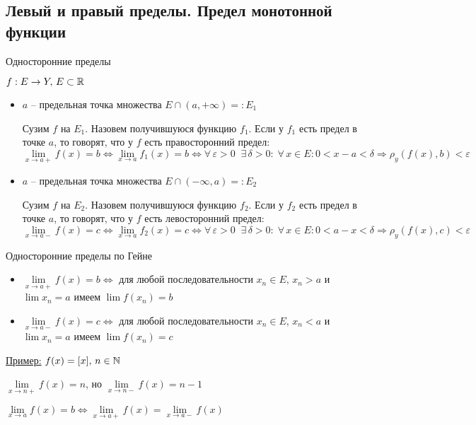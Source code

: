 \subsection{Левый и правый пределы. Предел монотонной функции \href{https://youtu.be/BiTNBigkkyU?t=6035}{\Walley}}
\begin{conj}
    Односторонние пределы
\end{conj}
$f : E \to Y, \, E \subset \mathbb{R}$
\begin{itemize}
    \item $a$ -- предельная точка множества $E \cap (a, +\infty) =: E_1$
    
    Сузим $f$ на $E_1$. Назовем получившуюся функцию $f_1$. 
    Если у $f_1$ есть предел в точке $a$, то говорят, что у $f$ есть правосторонний предел:
    \[ \lim_{x \to a+} f(x) = b \Longleftrightarrow \lim_{x \to a} f_1(x) = b \Longleftrightarrow 
    \forall \, \varepsilon > 0 \;\; \exists \, \delta > 0 : \; \forall \, x \in E : 0 < x - a < \delta \Rightarrow\rho_y(f(x), b) < \varepsilon \]
    
    \item $a$ -- предельная точка множества $E \cap (-\infty, a) =: E_2$
    
    Сузим $f$ на $E_2$. Назовем получившуюся функцию $f_2$.
    Если у $f_2$ есть предел в точке $a$, то говорят, что у $f$ есть левосторонний предел:
    \[ \lim_{x \to a-} f(x) = c \Longleftrightarrow \lim_{x \to a} f_2(x) = c \Longleftrightarrow 
    \forall \, \varepsilon > 0 \;\; \exists \, \delta > 0 : \; \forall \, x \in E : 0 < a - x < \delta \Rightarrow\rho_y(f(x), c) < \varepsilon \]
\end{itemize}
\begin{conj}
    Односторонние пределы по Гейне
\end{conj}
\begin{itemize}
    \item $\lim\limits_{x \to a+} f(x) = b \Longleftrightarrow$ для любой последовательности $x_n \in E, \, x_n > a$ и $\lim x_n = a$ имеем $\lim f(x_n) = b$
    \item $\lim\limits_{x \to a-} f(x) = c \Longleftrightarrow$ для любой последовательности $x_n \in E, \, x_n < a$ и $\lim x_n = a$ имеем $\lim f(x_n) = c$
\end{itemize}
\underline{Пример:} $f(x) = [x], \, n \in \mathbb{N}$

$\lim\limits_{x \to n+} f(x) = n$, но $\lim\limits_{x \to n-} f(x) = n - 1$

\begin{notice}
    $\lim\limits_{x \to a} f(x) = b \Longleftrightarrow \lim\limits_{x \to a+} f(x) = \lim\limits_{x \to a-} f(x)$
\end{notice}

